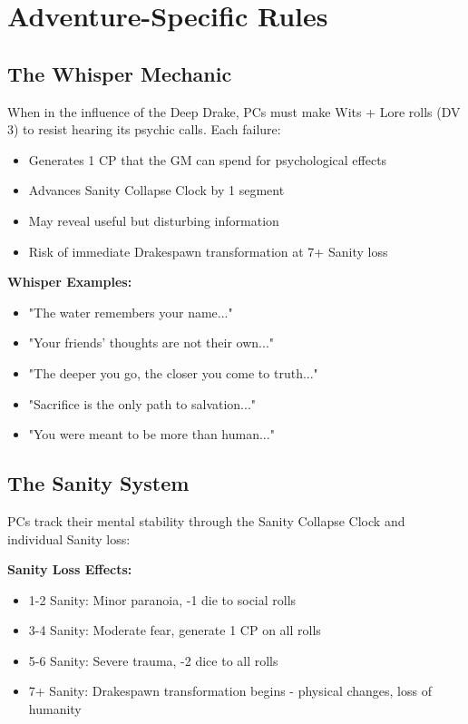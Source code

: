 \documentclass[11pt]{article}
\begin{document}
\section{Adventure-Specific Rules}

\subsection{The Whisper Mechanic}

When in the influence of the Deep Drake, PCs must make Wits + Lore rolls (DV 3) to resist hearing its psychic calls. Each failure:
\begin{itemize}
\item Generates 1 CP that the GM can spend for psychological effects
\item Advances Sanity Collapse Clock by 1 segment
\item May reveal useful but disturbing information
\item Risk of immediate Drakespawn transformation at 7+ Sanity loss
\end{itemize}

\textbf{Whisper Examples:}
\begin{itemize}
\item "The water remembers your name..."
\item "Your friends' thoughts are not their own..."
\item "The deeper you go, the closer you come to truth..."
\item "Sacrifice is the only path to salvation..."
\item "You were meant to be more than human..."
\end{itemize}

\subsection{The Sanity System}

PCs track their mental stability through the Sanity Collapse Clock and individual Sanity loss:

\textbf{Sanity Loss Effects:}
\begin{itemize}
\item 1-2 Sanity: Minor paranoia, -1 die to social rolls
\item 3-4 Sanity: Moderate fear, generate 1 CP on all rolls
\item 5-6 Sanity: Severe trauma, -2 dice to all rolls
\item 7+ Sanity: Drakespawn transformation begins - physical changes, loss of humanity
\end{itemize}
\end{document}
